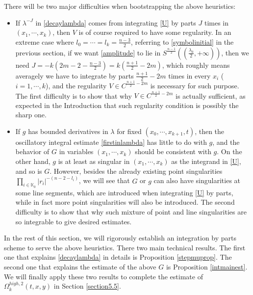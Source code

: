 \documentclass[11pt,reqno]{amsart}
\numberwithin{equation}{section}
\theoremstyle{definition}
\begin{document}
There will be two major difficulties when bootstrapping the above heuristics:

\begin{itemize}
	\item[(\romannumeral1)] If $\lambda^{-J}$ in \eqref{decaylambda} comes from integrating \eqref{U} by parts $J$ times in $(x_1,\cdots,x_k)$, then $V$ is of course required to have some regularity. In an extreme case where $l_0=\cdots=l_k=\frac{n-3}{2}$, referring to \eqref{symbolinitial} in the previous section, if we want \eqref{amplitude} to lie in $S^{\frac{n-1}{2}}((\frac{\lambda_0}{2},+\infty))$, then we need $J=-k(2m-2-\frac{n-3}{2})=k(\frac{n+1}{2}-2m)$, which roughly means averagely we have to integrate by parts $\frac{n+1}{2}-2m$ times in every $x_i$ ($i=1,\cdots,k$), and the regularity $V\in C^{\frac{n+1}{2}-2m}$ is necessary for such purpose. The first difficulty is to show that why $V\in C^{\frac{n+1}{2}-2m}$ is actually sufficient, as expected in the Introduction that such regularity condition is possibly the sharp one.
	
	\item[(\romannumeral2)] If $g$ has bounded derivatives in $\lambda$ for fixed $(x_0,\cdots,x_{k+1},t)$, then the oscillatory integral estimate \eqref{firstinlambda} has little to do with $g$, and the behavior of $G$ in variables $(x_1,\cdots,x_k)$ should be consistent with $g$. On the other hand, $g$ is at least as singular in $(x_1,\cdots,x_k)$ as the integrand in \eqref{U}, and so is $G$. However, besides the already existing point singularities $\prod_{i\in\mathbb{K}_0}|r_i|^{-(n-2-l_i)}$, we will see that $G$ or $g$ can also have singularities at some line segments, which are introduced when integrating \eqref{U} by parts, while in fact more point singularities will also be introduced. The second difficulty is to show that why such mixture of point and line singularities are so integrable to give desired estimates.
\end{itemize}

In the rest of this section, we will rigorously establish an integration by parts scheme to serve the above heuristics. There two main technical results. The first one that explains \eqref{decaylambda} in details is Proposition \ref{stepmuprop}. The second one that explains the estimate of the above $G$ is Proposition \ref{intmainest}. We will finally apply these two results to complete the estimate of $\Omega_k^{high,2}(t,x,y)$ in Section \ref{section5.5}.
\end{document}
